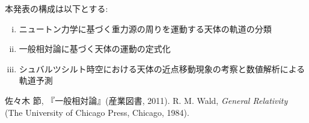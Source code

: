 \documentclass[dvipdfmx]{jsarticle} %
\begin{document}
本発表の構成は以下とする:
\begin{enumerate}[(i)\,]
\item ニュートン力学に基づく重力源の周りを運動する天体の軌道の分類\\
\item 一般相対論に基づく天体の運動の定式化\\
\item シュバルツシルト時空における天体の近点移動現象の考察と数値解析による軌道予測
\end{enumerate}
\begin{thebibliography}{99}
佐々木 節, 『一般相対論』(産業図書, 2011). 
R. M. Wald, \textit{General Relativity} (The University of Chicago Press, Chicago, 1984).
\end{thebibliography}
\end{document}
